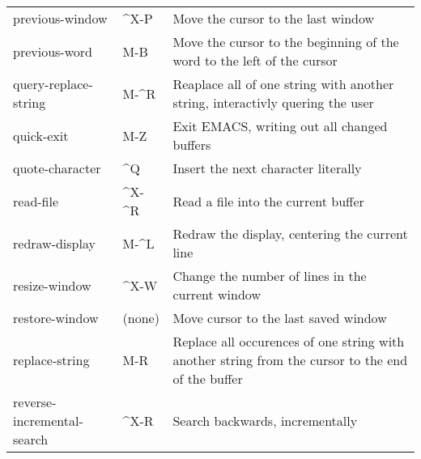 \begin{tabular}{llp{283pt}}
previous-window  &  \^{}X-P & Move the cursor to the last window\\

previous-word &  M-B & Move the cursor to the beginning of the
word to the left of the cursor\\

query-replace-string &  M-\^{}R & Reaplace all of one string with another
string, interactivly quering the user\\

quick-exit &  M-Z & Exit EMACS, writing out all changed buffers\\

quote-character  &  \^{}Q & Insert the next character literally\\

read-file &  \^{}X-\^{}R & Read a file into the current buffer\\

redraw-display &  M-\^{}L & Redraw the display, centering the
current line\\

resize-window &  \^{}X-W & Change the number of lines in the
current window\\

restore-window & (none) & Move cursor to the last saved window\\

replace-string &  M-R & Replace all occurences of one string
with another string from the cursor
to the end of the buffer\\

reverse-incremental-search & \^{}X-R & Search backwards, incrementally\\
\end{tabular}

